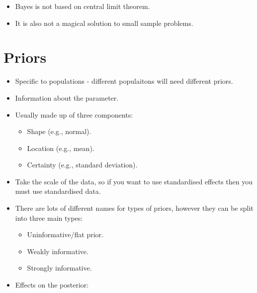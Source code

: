 \documentclass[]{book}
\providecommand{\tightlist}{%
  \setlength{\itemsep}{0pt}\setlength{\parskip}{0pt}}
\begin{document}
\begin{itemize}
\begin{itemize}
    \begin{itemize}
    \tightlist
    \item
      Bayes is not based on central limit theorem.
    \item
      It is also not a magical solution to small sample problems.
    \end{itemize}
  \end{itemize}
\end{itemize}

\hypertarget{priors}{%
\section{Priors}\label{priors}}

\begin{itemize}
\tightlist
\item
  Specific to populations - different populaitons will need different priors.
\item
  Information about the parameter.
\item
  Usually made up of three components:

  \begin{itemize}
  \tightlist
  \item
    Shape (e.g., normal).
  \item
    Location (e.g., mean).
  \item
    Certainty (e.g., standard deviation).
  \end{itemize}
\item
  Take the scale of the data, so if you want to use standardised effects then you must use standardised data.
\item
  There are lots of different names for types of priors, however they can be split into three main types:

  \begin{itemize}
  \tightlist
  \item
    Uninformative/flat prior.
  \item
    Weakly informative.
  \item
    Strongly informative.
  \end{itemize}
\item
  Effects on the posterior:


\end{itemize}
\end{document}
